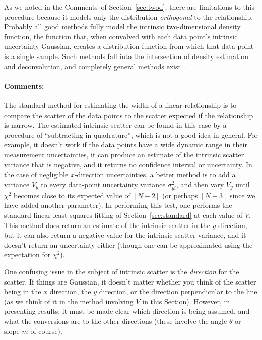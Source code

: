 \documentclass[12pt,twoside]{article}
\newcommand{\sectionname}{Section}
\newcommand{\commentsname}{Comments}
\newenvironment{comments}{\paragraph{\commentsname:}}{}
\begin{document}
As we noted in the \commentsname\ of \sectionname~\ref{sec:twod},
there are limitations to this procedure because it models only the
distribution \emph{orthogonal} to the relationship.  Probably all good
methods fully model the intrinsic two-dimensional density function,
the function that, when convolved with each data point's intrinsic
uncertainty Gaussian, creates a distribution function from which that
data point is a single sample.  Such methods fall into the
intersection of density estimation and deconvolution, and completely
general methods exist \citep{kelly07,bovy}.

\begin{comments}
The standard method for estimating the width of a linear relationship
is to compare the scatter of the data points to the scatter expected
if the relationship is narrow.  The estimated intrinsic scatter can be
found in this case by a procedure of ``subtracting in quadrature'',
which is not a good idea in general.  For example, it doesn't work if
the data points have a wide dynamic range in their measurement
uncertainties, it can produce an estimate of the intrinsic scatter
variance that is negative, and it returns no confidence interval or
uncertainty.  In the case of negligible $x$-direction uncertainties, a
better method is to add a variance $V_y$ to every data-point
uncertainty variance $\sigma_{yi}^2$, and then vary $V_y$ until
$\chi^2$ becomes close to its expected value of $[N-2]$ (or perhaps
$[N-3]$ since we have added another parameter).  In performing this
test, one performs the standard linear least-squares fitting of
\sectionname~\ref{sec:standard} at each value of $V$.  This method
does return an estimate of the intrinsic scatter in the $y$-direction,
but it can also return a negative value for the intrinsic scatter
variance, and it doesn't return an uncertainty either (though one can
be approximated using the expectation for $\chi^2$).

One confusing issue in the subject of intrinsic scatter is the
\emph{direction} for the scatter.  If things are Gaussian, it doesn't
matter whether you think of the scatter being in the $x$ direction,
the $y$ direction, or the direction perpendicular to the line (as we
think of it in the method involving $V$ in this \sectionname).
However, in presenting results, it must be made clear which direction
is being assumed, and what the conversions are to the other directions
(these involve the angle $\theta$ or slope $m$ of course).
\end{comments}
\end{document}
